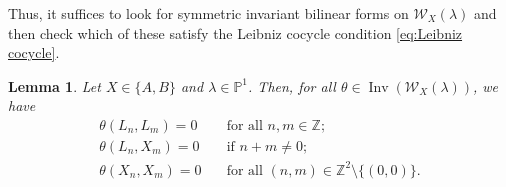 \documentclass[11pt, svgnames]{amsart}
\DeclareMathOperator{\Inv}{Inv}
\newcommand{\ZZ}{\mathbb{Z}}
\newcommand{\PP}{\mathbb{P}}
\newcommand{\W}{\mathcal{W}}
\newtheorem{lemma}[proposition]{Lemma}
\theoremstyle{definition}
\begin{document}
Thus, it suffices to look for symmetric invariant bilinear forms on $\W_X (\lambda)$ and then check which of these satisfy the Leibniz cocycle condition \eqref{eq:Leibniz cocycle}.

\begin{lemma}\label{lem: components of invariants forms on W_X()}
    Let $X \in \{A,B\}$ and $\lambda \in \PP^1$. Then, for all $\theta \in \Inv(\W_X(\lambda))$, we have
    \begin{align*}
        \theta(L_n, L_m) = 0 \quad &\text{for all } n,m \in \ZZ; \\
        \theta(L_n, X_m) = 0 \quad &\text{if } n + m \neq 0; \\
        \theta(X_n, X_m) = 0 \quad &\text{for all } (n,m) \in \ZZ^2 \setminus \{(0,0)\}.
    \end{align*}
\end{lemma}
\end{document}
